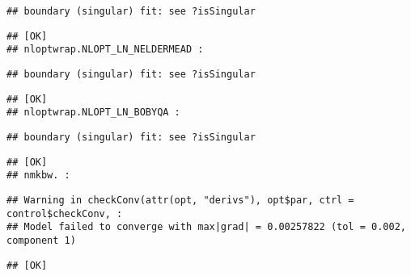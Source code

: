 \documentclass[
]{article}
\begin{document}
\begin{verbatim}
## boundary (singular) fit: see ?isSingular
\end{verbatim}

\begin{verbatim}
## [OK]
## nloptwrap.NLOPT_LN_NELDERMEAD :
\end{verbatim}

\begin{verbatim}
## boundary (singular) fit: see ?isSingular
\end{verbatim}

\begin{verbatim}
## [OK]
## nloptwrap.NLOPT_LN_BOBYQA :
\end{verbatim}

\begin{verbatim}
## boundary (singular) fit: see ?isSingular
\end{verbatim}

\begin{verbatim}
## [OK]
## nmkbw. :
\end{verbatim}

\begin{verbatim}
## Warning in checkConv(attr(opt, "derivs"), opt$par, ctrl = control$checkConv, :
## Model failed to converge with max|grad| = 0.00257822 (tol = 0.002, component 1)
\end{verbatim}

\begin{verbatim}
## [OK]
\end{verbatim}
\end{document}
